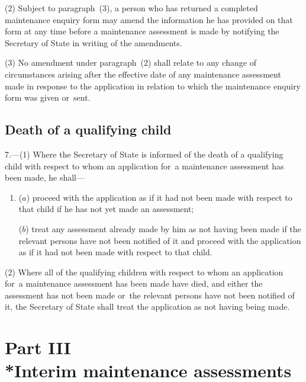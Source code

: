 \documentclass[a4paper,12pt]{article}
\begin{document}
(2) Subject to paragraph~(3), a person who has returned a completed maintenance enquiry form may amend the information he has provided on that form at any time before a maintenance assessment is made by notifying the Secretary of State in writing of the amendments.

(3) No amendment under paragraph~(2) shall relate to any change of circumstances arising after the effective date of any maintenance assessment made in response to the application in relation to which the maintenance enquiry form was given or~sent.

\subsection[7. Death of a qualifying child]{Death of a qualifying child}

7.—(1) Where 
the Secretary of State  %
is informed of the death of a qualifying child with respect to whom an application for~a maintenance assessment has been made, he shall—
\begin{enumerate}\item[]
($a$) proceed with the application as if it had not been made with respect to that child if he has not yet made an assessment;

($b$) treat any assessment already made by him as not having been made if the relevant persons have not been notified of it and proceed with the application as if it had not been made with respect to that child.
\end{enumerate}

(2) Where all of the qualifying children with respect to whom an application for~a maintenance assessment has been made have died, and either the assessment has not been made or~the relevant persons have not been notified of it, 
the Secretary of State  %
shall treat the application as not having being made.


\section[Part III --- Interim maintenance assessments]{Part III\\*Interim maintenance assessments}
\end{document}

